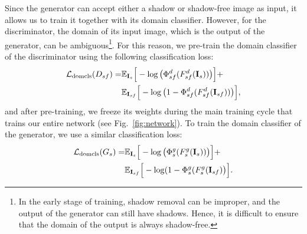 \documentclass[10pt,twocolumn,letterpaper]{article}
\begin{document}
Since the generator can accept either a shadow or shadow-free image as input, it allows us to train it together with its domain classifier. However, for the discriminator, the domain of its input image, which is the output of the generator, can be ambiguous\footnote{In the early stage of training, shadow removal can be improper, and the output of the generator can still have shadows. Hence, it is difficult to ensure that the domain of the output is always shadow-free.}.
For this reason, we pre-train the domain classifier of the discriminator using the following classification loss:
\begin{align}
	\mathcal{L}_{\rm domcls}(D_{sf}) =  
	& \mathbb{E}_{\mathbf{I}_{s}} \Big[-\log\big(\Phi^d_{sf}(F^d_{sf}(\mathbf{I}_{s}))\big)\Big]
	+\nonumber\\& \mathbb{E}_{\mathbf{I}_{sf}} \Big[-\log\big(1-\Phi^d_{sf}(F^d_{sf}(\mathbf{I}_{sf}))\big)\Big],
	\label{eq:loss_cam_d}
\end{align}
and after pre-training, we freeze its weights during the main training cycle that trains our entire network (see Fig.~\ref{fig:network}). To train the domain classifier of the generator, we use a similar classification loss:
\begin{align}
	\mathcal{L}_{\rm domcls}(G_s) =  
	& \mathbb{E}_{\mathbf{I}_s} \Big[-\log\big(\Phi^g_{s}(F^g_s(\mathbf{I}_s))\big)\Big]
	+\nonumber\\& \mathbb{E}_{\mathbf{I}_{sf}} \Big[-\log(1-\Phi^g_{s}(F^g_s(\mathbf{I}_{sf})\big)\Big].
	\label{eq:loss_cam_g}
\end{align}
 
\end{document}
